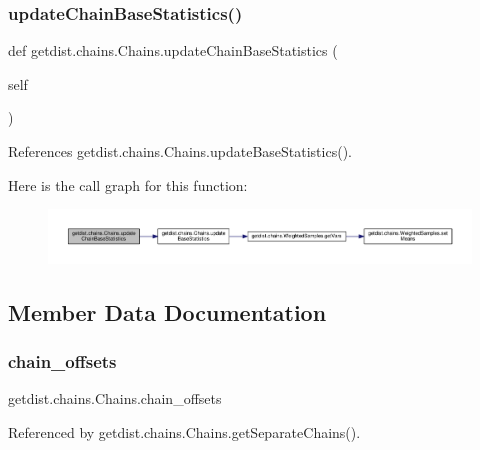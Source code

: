 \subsubsection{\texorpdfstring{update\+Chain\+Base\+Statistics()}{updateChainBaseStatistics()}}
{\footnotesize\ttfamily def getdist.\+chains.\+Chains.\+update\+Chain\+Base\+Statistics (\begin{DoxyParamCaption}\item[{}]{self }\end{DoxyParamCaption})}



References getdist.\+chains.\+Chains.\+update\+Base\+Statistics().

Here is the call graph for this function\+:
\nopagebreak
\begin{figure}[H]
\begin{center}
\leavevmode
\includegraphics[width=350pt]{classgetdist_1_1chains_1_1Chains_a29e10cc055140e1f5639b8ff9331b1c4_cgraph}
\end{center}
\end{figure}


\subsection{Member Data Documentation}
\mbox{\label{classgetdist_1_1chains_1_1Chains_a8722e59c186cf2044878b23a86607b1a}} 
\subsubsection{\texorpdfstring{chain\+\_\+offsets}{chain\_offsets}}
{\footnotesize\ttfamily getdist.\+chains.\+Chains.\+chain\+\_\+offsets}



Referenced by getdist.\+chains.\+Chains.\+get\+Separate\+Chains().

\mbox{\label{classgetdist_1_1chains_1_1Chains_a736853e597f290de361a349a8c452649}} 
